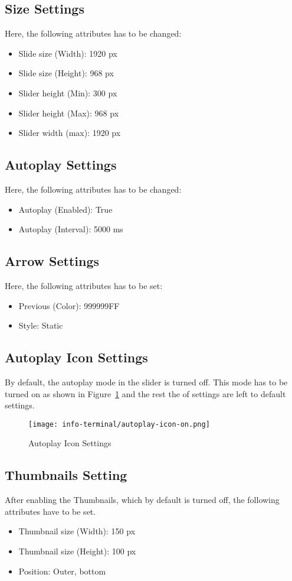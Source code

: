 \subsection*{Size Settings}
Here, the following attributes has to be changed:
\begin{itemize}
\item Slide size (Width): 1920 px
\item Slide size (Height): 968 px
\item Slider height (Min): 300 px
\item Slider height (Max): 968 px
\item Slider width (max): 1920 px
\end{itemize}

\subsection*{Autoplay Settings}
Here, the following attributes has to be changed:
\begin{itemize}
\item Autoplay (Enabled): True
\item Autoplay (Interval): 5000 ms
\end{itemize}

\subsection*{Arrow Settings}
Here, the following attributes has to be set:
\begin{itemize}
\item Previous (Color): 999999FF
\item Style: Static
\end{itemize}

\subsection*{Autoplay Icon Settings}
By default, the autoplay mode in the slider is turned off. This mode has to be turned on as shown in Figure~\ref{autoplay-icon-on} and the rest the of settings are left to default settings.
\begin{figure}[ht]
\caption{Autoplay Icon Settings}
\label{autoplay-icon-on}
\centering
\texttt{[image: info-terminal/autoplay-icon-on.png]}
\end{figure}

\subsection*{Thumbnails Setting}
After enabling the Thumbnails, which by default is turned off, the following attributes have to be set.
\begin{itemize}
\item Thumbnail size (Width): 150 px
\item Thumbnail size (Height): 100 px
\item Position: Outer, bottom
\end{itemize}

